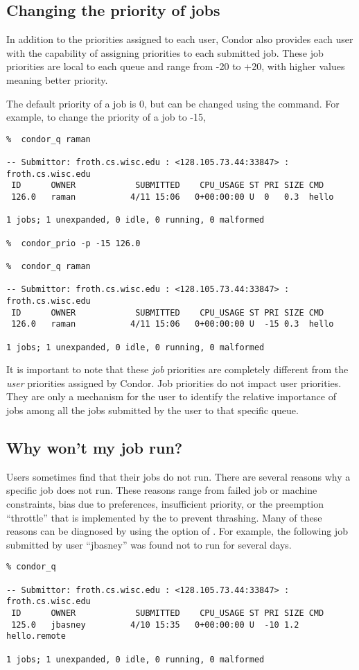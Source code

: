 \subsection{Changing the priority of jobs}
In addition to the priorities assigned to each user, Condor also provides
each user with the capability of assigning priorities to each submitted job.
These job priorities are local to each queue and range from -20 to +20, with
higher values meaning better priority.

The default priority of a job is 0, but can be changed using the 
command.  For example, to change the priority of a job to -15,
\begin{verbatim}
%  condor_q raman

-- Submittor: froth.cs.wisc.edu : <128.105.73.44:33847> : froth.cs.wisc.edu
 ID      OWNER            SUBMITTED    CPU_USAGE ST PRI SIZE CMD               
 126.0   raman           4/11 15:06   0+00:00:00 U  0   0.3  hello             

1 jobs; 1 unexpanded, 0 idle, 0 running, 0 malformed

%  condor_prio -p -15 126.0

%  condor_q raman

-- Submittor: froth.cs.wisc.edu : <128.105.73.44:33847> : froth.cs.wisc.edu
 ID      OWNER            SUBMITTED    CPU_USAGE ST PRI SIZE CMD               
 126.0   raman           4/11 15:06   0+00:00:00 U  -15 0.3  hello             

1 jobs; 1 unexpanded, 0 idle, 0 running, 0 malformed
\end{verbatim}

It is important to note that these \emph{job} priorities are completely 
different from the \emph{user} priorities assigned by Condor.  Job priorities
do not impact user priorities.  They are only a mechanism for the user to
identify the relative importance of jobs among all the jobs submitted by the
user to that specific queue.

\subsection{Why won't my job run?}
Users sometimes find that their jobs do not run.  There are several reasons why
a specific job does not run.  These reasons range from failed job or machine
constraints, bias due to preferences, insufficient priority, or the preemption
``throttle'' that is implemented by the  to prevent
thrashing.  Many of these reasons can be diagnosed by using the 
option of .  For example, the following job submitted by user
``jbasney'' was found not to run for several days.
\begin{verbatim}
% condor_q

-- Submittor: froth.cs.wisc.edu : <128.105.73.44:33847> : froth.cs.wisc.edu
 ID      OWNER            SUBMITTED    CPU_USAGE ST PRI SIZE CMD               
 125.0   jbasney         4/10 15:35   0+00:00:00 U  -10 1.2  hello.remote      

1 jobs; 1 unexpanded, 0 idle, 0 running, 0 malformed
\end{verbatim}

